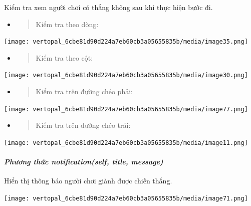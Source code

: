 \documentclass[a4paper]{article}
\begin{document}
Kiểm tra xem người chơi có thắng không sau khi thực hiện bước đi.

\begin{itemize}
\item
  \begin{quote}
  Kiểm tra theo dòng:
  \end{quote}
\end{itemize}

\texttt{[image: vertopal\_6cbe81d90d224a7eb60cb3a05655835b/media/image35.png]}

\begin{itemize}
\item
  \begin{quote}
  Kiểm tra theo cột:
  \end{quote}
\end{itemize}

\texttt{[image: vertopal\_6cbe81d90d224a7eb60cb3a05655835b/media/image30.png]}

\begin{itemize}
\item
  \begin{quote}
  Kiểm tra trên đường chéo phải:
  \end{quote}
\end{itemize}

\texttt{[image: vertopal\_6cbe81d90d224a7eb60cb3a05655835b/media/image77.png]}

\begin{itemize}
\item
  \begin{quote}
  Kiểm tra trên đường chéo trái:
  \end{quote}
\end{itemize}

\texttt{[image: vertopal\_6cbe81d90d224a7eb60cb3a05655835b/media/image11.png]}

\hypertarget{phux1b0ux1a1ng-thux1ee9c-notificationself-title-message}{%
\paragraph{\texorpdfstring{\emph{Phương thức notification(self,
title,
message)}}{Phương thức notification(self, title, message)}}\label{phux1b0ux1a1ng-thux1ee9c-notificationself-title-message}}

Hiển thị thông báo người chơi giành được chiến thắng.

\texttt{[image: vertopal\_6cbe81d90d224a7eb60cb3a05655835b/media/image71.png]}
\end{document}
